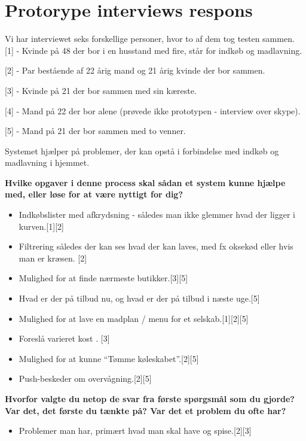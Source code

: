 \chapter{Protorype interviews respons}\label{ch:protorespons}
Vi har interviewet seks forskellige personer, hvor to af dem tog testen sammen.
{[}1{]} - Kvinde på 48 der bor i en husstand med fire, står for indkøb og madlavning.

{[}2{]} - Par bestående af 22 årig mand og 21 årig kvinde der bor sammen.

{[}3{]} - Kvinde på 21 der bor sammen med sin kæreste.

{[}4{]} - Mand på 22 der bor alene (prøvede ikke prototypen - interview over skype).

{[}5{]} - Mand på 21 der bor sammen med to venner.

Systemet hjælper på problemer, der kan opstå i forbindelse med indkøb og madlavning i hjemmet.

\textbf{Hvilke opgaver i denne process skal sådan et system kunne hjælpe med, eller løse for at være nyttigt for dig?}
\begin{itemize}
	\item Indkøbslister med afkrydsning - således man ikke glemmer hvad der ligger i kurven.{[}1{]}{[}2{]}
	\item Filtrering således der kan ses hvad der kan laves, med fx oksekød eller hvis man er kræsen. {[}2{]} 
	\item Mulighed for at finde nærmeste butikker.{[}3{]}{[}5{]}
	\item Hvad er der på tilbud nu, og hvad er der på tilbud i næste uge.{[}5{]}
	\item Mulighed for at lave en madplan / menu for et selskab.{[}1{]}{[}2{]}{[}5{]}
	\item Foreslå varieret kost . {[}3{]}
	\item Mulighed for at kunne “Tømme køleskabet”.{[}2{]}{[}5{]}
	\item Push-beskeder om overvågning.{[}2{]}{[}5{]}
\end{itemize}

\textbf{Hvorfor valgte du netop de svar fra første spørgsmål som du gjorde? Var det, det første
du tænkte på? Var det et problem du ofte har?}
\begin{itemize}
	\item Problemer man har, primært hvad man skal have og spise.{[}2{]}{[}3{]}
\end{itemize}

